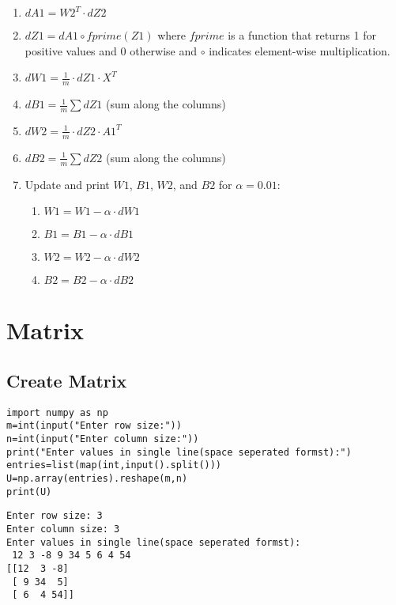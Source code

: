 \begin{enumerate}
\begin{enumerate}
        \item $dA1 = W2^T \cdot dZ2$
        \item $dZ1 = dA1 \circ fprime(Z1)$ \hspace{0.2cm} where $fprime$ is a function that returns 1 for positive values and 0 otherwise and $\circ$ indicates element-wise multiplication.
        \item $dW1 = \frac{1}{m} \cdot dZ1 \cdot X^T$
        \item $dB1 = \frac{1}{m} \sum dZ1$ \hspace{0.2cm} (sum along the columns)
        \item $dW2 = \frac{1}{m} \cdot dZ2 \cdot A1^T$
        \item $dB2 = \frac{1}{m} \sum dZ2$ \hspace{0.2cm} (sum along the columns)
        \item Update and print $W1$, $B1$, $W2$, and $B2$ for $\alpha = 0.01$:
        \begin{enumerate}
            \item $W1 = W1 - \alpha \cdot dW1$
            \item $B1 = B1 - \alpha \cdot dB1$
            \item $W2 = W2 - \alpha \cdot dW2$
            \item $B2 = B2 - \alpha \cdot dB2$
        \end{enumerate}
    \end{enumerate}
\end{enumerate}









\section{Matrix}
\vspace{-.15cm}
\subsection{Create Matrix}
\vspace{-.75cm}
\begin{code}
\begin{lstlisting}
import numpy as np
m=int(input("Enter row size:"))
n=int(input("Enter column size:"))
print("Enter values in single line(space seperated formst):")
entries=list(map(int,input().split()))
U=np.array(entries).reshape(m,n)
print(U)
\end{lstlisting}
\end{code}
\vspace{-1cm}
\begin{verbatim}
Enter row size: 3
Enter column size: 3
Enter values in single line(space seperated formst):
 12 3 -8 9 34 5 6 4 54
[[12  3 -8]
 [ 9 34  5]
 [ 6  4 54]]
\end{verbatim}
\vspace{-.6cm}
